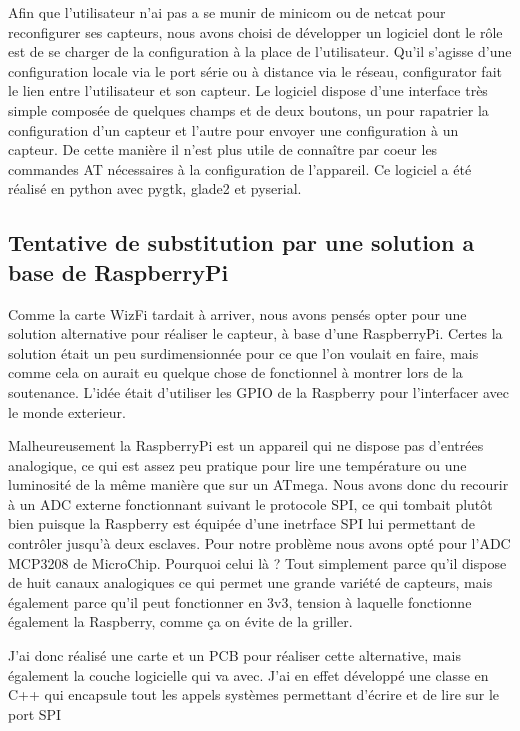 {		Afin que l'utilisateur n'ai pas a se munir de minicom ou de netcat pour reconfigurer
		ses capteurs, nous avons choisi de développer un logiciel dont le rôle est de se
		charger de la configuration à la place de l'utilisateur. Qu'il s'agisse d'une configuration
		locale via le port série ou à distance via le réseau, configurator fait le lien
		entre l'utilisateur et son capteur. Le logiciel dispose d'une interface très simple composée
		de quelques champs et de deux boutons, un pour rapatrier la configuration d'un capteur et l'autre
		pour envoyer une configuration à un capteur. De cette manière il n'est plus utile de connaître
		par coeur les commandes AT nécessaires à la configuration de l'appareil. Ce logiciel a été
		réalisé en python avec pygtk, glade2 et pyserial.
	
	\subsection{Tentative de substitution par une solution a base de RaspberryPi}
		Comme la carte WizFi tardait à arriver, nous avons pensés opter pour une solution alternative
		pour réaliser le capteur, à base d'une RaspberryPi. Certes la solution était un peu surdimensionnée
		pour ce que l'on voulait en faire, mais comme cela on aurait eu quelque chose de fonctionnel
		à montrer lors de la soutenance. L'idée était d'utiliser les GPIO de la Raspberry pour
		l'interfacer avec le monde exterieur.
		\par
		Malheureusement la RaspberryPi est un appareil qui ne dispose pas d'entrées analogique,
		ce qui est assez peu pratique pour lire une température ou une luminosité de la même manière que
		sur un ATmega. Nous avons donc du recourir à un ADC externe fonctionnant suivant le protocole SPI,
		ce qui tombait plutôt bien puisque la Raspberry est équipée d'une inetrface SPI lui permettant
		de contrôler jusqu'à deux esclaves. Pour notre problème nous avons opté pour l'ADC MCP3208 de
		MicroChip. Pourquoi celui là ? Tout simplement parce qu'il dispose de huit canaux analogiques ce qui
		permet une grande variété de capteurs, mais également parce qu'il peut fonctionner en 3v3, tension à
		laquelle fonctionne également la Raspberry, comme ça on évite de la griller.
		\par
		J'ai donc réalisé une carte et un PCB pour réaliser cette alternative, mais également
		la couche logicielle qui va avec. J'ai en effet développé une classe en C++ qui
		encapsule tout les appels systèmes permettant d'écrire et de lire sur le port SPI
}
